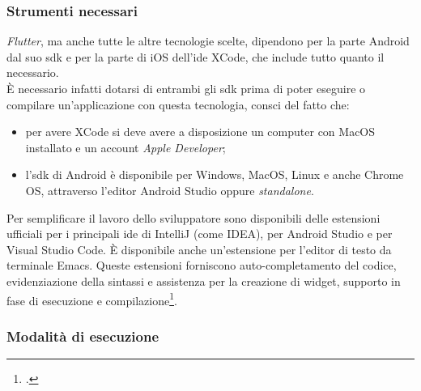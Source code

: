 \subsubsection{Strumenti necessari}
\label{subsubsec:strumenti-necessari}

\emph{Flutter}, ma anche tutte le altre tecnologie scelte, dipendono per la parte Android dal suo \gls{sdk} e per la parte di iOS dell'\gls{ide} XCode, che include tutto quanto il necessario.\\
È necessario infatti dotarsi di entrambi gli \gls{sdk} prima di poter eseguire o compilare un'applicazione con questa tecnologia, consci del fatto che:
\begin{itemize}
    \item per avere XCode si deve avere a disposizione un computer con MacOS installato e un account \emph{Apple Developer};
    \item l'\gls{sdk} di Android è disponibile per Windows, MacOS, Linux e anche Chrome OS, attraverso l'editor Android Studio oppure \emph{standalone}.
\end{itemize}
Per semplificare il lavoro dello sviluppatore sono disponibili delle estensioni ufficiali per i principali \gls{ide} di IntelliJ (come IDEA), per Android Studio e per Visual Studio Code. È disponibile anche un'estensione per l'editor di testo da terminale Emacs.
Queste estensioni forniscono auto-completamento del codice, evidenziazione della sintassi e assistenza per la creazione di widget, supporto in fase di esecuzione e compilazione\footcite{site:flutter-editor-setup}.

\subsubsection{Modalità di esecuzione}
\label{subsubsec:modalita-esecuzione}

